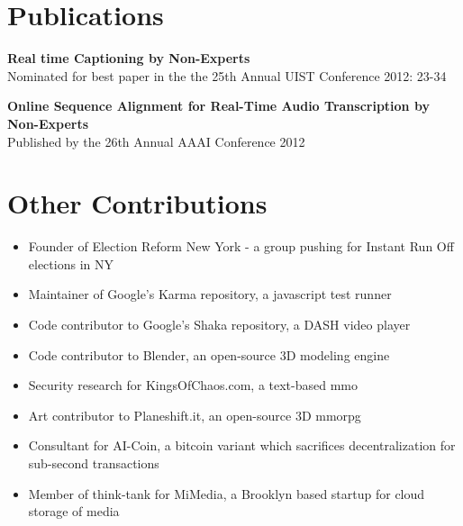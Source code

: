 \documentclass[oneside, final]{scrartcl}
\begin{document}
\begin{center}
\section{Publications}
\begin{flushleft}
\textbf{Real time Captioning by Non-Experts\\}
Nominated for best paper in the the 25th Annual UIST Conference 2012: 23-34\\

\vspace{10pt}

\textbf{Online Sequence Alignment for Real-Time Audio Transcription by Non-Experts \\}
Published by the 26th Annual AAAI Conference 2012\\
\end{flushleft}


\section{Other Contributions}
\begin{itemize}
   \begin{comment}
        \item CIO of Beach Recovery Foundation, non-profit working to reverse human effect on beach erosion
        \item CTO of Simplify Reality, distills current events into 400 word summaries for millennials
    \end{comment}
    \item Founder of Election Reform New York - a group pushing for Instant Run Off elections in NY
    \item Maintainer of Google's Karma repository, a javascript test runner
    \item Code contributor to Google's Shaka repository, a DASH video player
    \item Code contributor to Blender, an open-source 3D modeling engine
    \item Security research for KingsOfChaos.com, a text-based mmo
    \item Art contributor to Planeshift.it, an open-source 3D mmorpg
    \item Consultant for AI-Coin, a bitcoin variant which sacrifices decentralization for sub-second transactions
    \item Member of think-tank for MiMedia, a Brooklyn based startup for cloud storage of media
\end{itemize}




\end{center}
\end{document}
